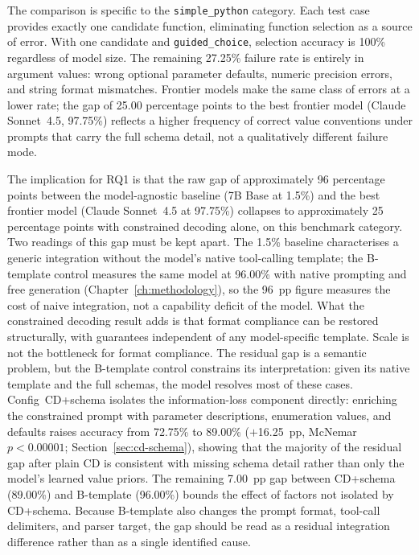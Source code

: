 The comparison is specific to the \texttt{simple\_python} category. Each test
case provides exactly one candidate function, eliminating function selection
as a source of error. With one candidate and \texttt{guided\_choice},
selection accuracy is 100\% regardless of model size. The remaining 27.25\%
failure rate is entirely in argument values: wrong optional parameter defaults,
numeric precision errors, and string format mismatches. Frontier models make
the same class of errors at a lower rate; the gap of 25.00 percentage points
to the best frontier model (Claude Sonnet~4.5, 97.75\%) reflects a higher
frequency of correct value conventions under prompts that carry the full
schema detail, not a qualitatively different failure mode.

The implication for RQ1 is that the raw gap of approximately
96 percentage points between the model-agnostic baseline (7B Base at 1.5\%)
and the best frontier model (Claude Sonnet~4.5 at 97.75\%)
collapses to approximately 25 percentage points with constrained decoding
alone, on this benchmark category. Two readings of this gap must be kept
apart. The 1.5\% baseline characterises a generic integration without the
model's native tool-calling template; the B-template control measures the
same model at 96.00\% with native prompting and free generation
(Chapter~\ref{ch:methodology}), so the 96~pp figure measures the cost of
naive integration, not a capability deficit of the model. What the
constrained decoding result adds is that format compliance can be restored
structurally, with guarantees independent of any model-specific template.
Scale is not the bottleneck for format compliance. The residual gap is a
semantic problem, but the B-template control constrains its
interpretation: given its native template and the full schemas, the model
resolves most of these cases. Config~CD+schema isolates the information-loss
component directly: enriching the constrained prompt with parameter
descriptions, enumeration values, and defaults raises accuracy from
72.75\% to 89.00\% ($+$16.25~pp, McNemar $p < 0.00001$;
Section~\ref{sec:cd-schema}), showing that the majority of the residual
gap after plain CD is consistent with missing schema detail rather than only
the model's learned value priors. The remaining 7.00~pp gap between
CD+schema (89.00\%) and B-template (96.00\%) bounds the effect of factors
not isolated by CD+schema. Because B-template also changes the prompt format,
tool-call delimiters, and parser target, the gap should be read as a residual
integration difference rather than as a single identified cause.

